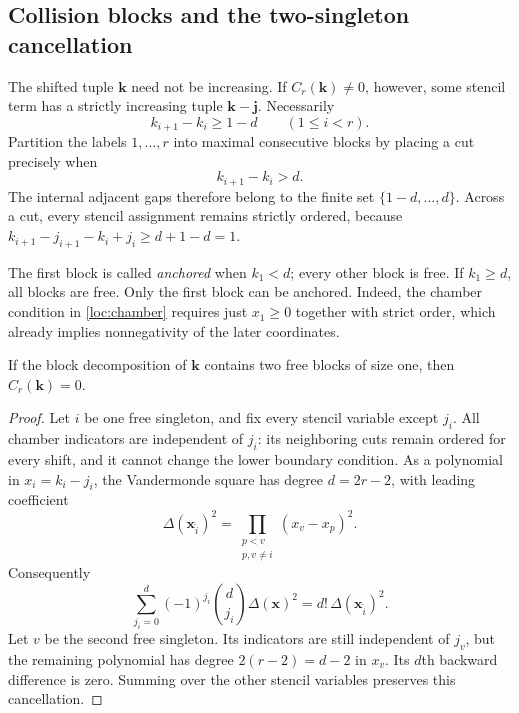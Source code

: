 \subsection{Collision blocks and the two-singleton cancellation}

The shifted tuple $\mathbf k$ need not be increasing.  If
$C_r(\mathbf k)\ne0$, however, some stencil term has a strictly increasing
tuple $\mathbf k-\mathbf j$.  Necessarily
\begin{equation}
 k_{i+1}-k_i\ge1-d\qquad(1\le i<r).
 \label{loc:gap-lower}
\end{equation}
Partition the labels $1,\ldots,r$ into maximal consecutive blocks by
placing a cut precisely when
\begin{equation}
 k_{i+1}-k_i>d.
 \label{loc:cut}
\end{equation}
The internal adjacent gaps therefore belong to the finite set
$\{1-d,\ldots,d\}$.  Across a cut, every stencil assignment remains
strictly ordered, because
$k_{i+1}-j_{i+1}-k_i+j_i\ge d+1-d=1$.

The first block is called \emph{anchored} when $k_1<d$; every other block
is free.  If $k_1\ge d$, all blocks are free.  Only the first block can
be anchored.  Indeed, the chamber condition in \eqref{loc:chamber}
requires just $x_1\ge0$ together with strict order, which already implies
nonnegativity of the later coordinates.

\begin{lemma}
\label{loc:singleton}
If the block decomposition of $\mathbf k$ contains two free blocks of
size one, then $C_r(\mathbf k)=0$.
\end{lemma}

\begin{proof}
Let $i$ be one free singleton, and fix every stencil variable except
$j_i$.  All chamber indicators are independent of $j_i$: its neighboring
cuts remain ordered for every shift, and it cannot change the lower
boundary condition.  As a polynomial in $x_i=k_i-j_i$, the Vandermonde
square has degree $d=2r-2$, with leading coefficient
\[
 \Delta(\mathbf x_{\widehat i})^2
       =\prod_{\substack{p<v\\p,v\ne i}}(x_v-x_p)^2.
\]
Consequently
\[
 \sum_{j_i=0}^d(-1)^{j_i}\binom d{j_i}\Delta(\mathbf x)^2
       =d!\,\Delta(\mathbf x_{\widehat i})^2.
\]
Let $v$ be the second free singleton.  Its indicators are still
independent of $j_v$, but the remaining polynomial has degree
$2(r-2)=d-2$ in $x_v$.  Its $d$th backward difference is zero.  Summing
over the other stencil variables preserves this cancellation.
\end{proof}

